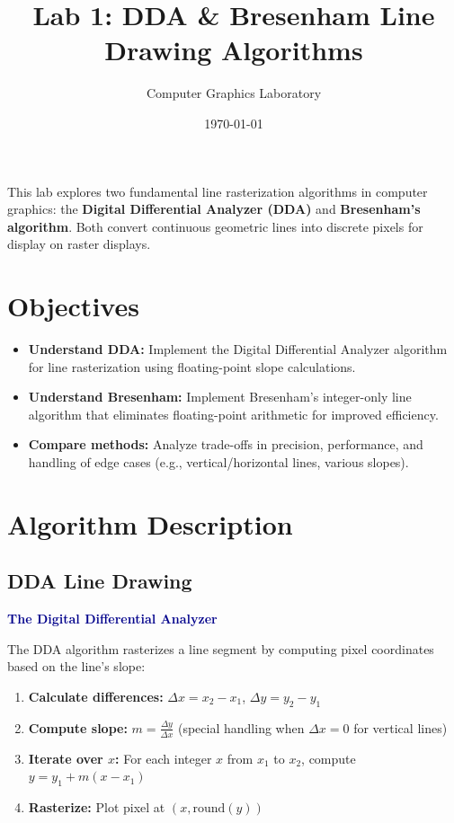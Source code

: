 \documentclass[12pt,a4paper]{article}
\title{{\color{darkblue}\huge Lab 1: DDA \& Bresenham Line Drawing Algorithms}}
\author{{\color{darkblue}Computer Graphics Laboratory}}
\date{{\color{darkblue}\today}}
\begin{document}
\maketitle

\begin{tcolorbox}[colback=lightgreen!20, colframe=darkblue, title=\textbf{Overview}]
This lab explores two fundamental line rasterization algorithms in computer graphics: the \textbf{Digital Differential Analyzer (DDA)} and \textbf{Bresenham's algorithm}. Both convert continuous geometric lines into discrete pixels for display on raster displays.
\end{tcolorbox}

\section{Objectives}
\begin{tcolorbox}[colback=gold!15, colframe=gold!60]
\begin{itemize}
  \item \textbf{Understand DDA:} Implement the Digital Differential Analyzer algorithm for line rasterization using floating-point slope calculations.
  
  \item \textbf{Understand Bresenham:} Implement Bresenham's integer-only line algorithm that eliminates floating-point arithmetic for improved efficiency.
  
  \item \textbf{Compare methods:} Analyze trade-offs in precision, performance, and handling of edge cases (e.g., vertical/horizontal lines, various slopes).
\end{itemize}
\end{tcolorbox}

\section{Algorithm Description}

\subsection{DDA Line Drawing}
\textcolor{darkblue}{\textbf{The Digital Differential Analyzer}}

The DDA algorithm rasterizes a line segment by computing pixel coordinates based on the line's slope:

\begin{enumerate}
  \item \textbf{Calculate differences:} $\Delta x = x_2 - x_1$, $\Delta y = y_2 - y_1$
  \item \textbf{Compute slope:} $m = \frac{\Delta y}{\Delta x}$ (special handling when $\Delta x = 0$ for vertical lines)
  \item \textbf{Iterate over $x$:} For each integer $x$ from $x_1$ to $x_2$, compute $y = y_1 + m(x - x_1)$
  \item \textbf{Rasterize:} Plot pixel at $(x, \mathrm{round}(y))$
\end{enumerate}
\end{document}
